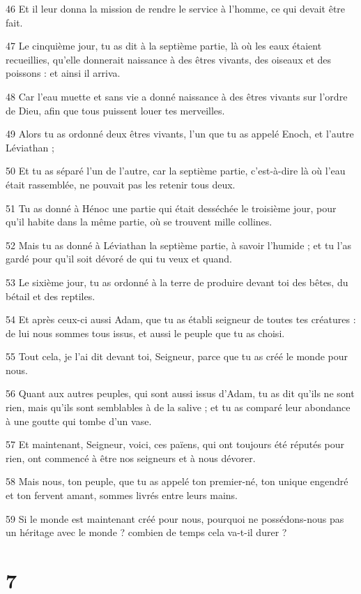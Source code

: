 \par 46 Et il leur donna la mission de rendre le service à l'homme, ce qui devait être fait.
\par 47 Le cinquième jour, tu as dit à la septième partie, là où les eaux étaient recueillies, qu'elle donnerait naissance à des êtres vivants, des oiseaux et des poissons : et ainsi il arriva.
\par 48 Car l'eau muette et sans vie a donné naissance à des êtres vivants sur l'ordre de Dieu, afin que tous puissent louer tes merveilles.
\par 49 Alors tu as ordonné deux êtres vivants, l'un que tu as appelé Enoch, et l'autre Léviathan ;
\par 50 Et tu as séparé l'un de l'autre, car la septième partie, c'est-à-dire là où l'eau était rassemblée, ne pouvait pas les retenir tous deux.
\par 51 Tu as donné à Hénoc une partie qui était desséchée le troisième jour, pour qu'il habite dans la même partie, où se trouvent mille collines.
\par 52 Mais tu as donné à Léviathan la septième partie, à savoir l'humide ; et tu l'as gardé pour qu'il soit dévoré de qui tu veux et quand.
\par 53 Le sixième jour, tu as ordonné à la terre de produire devant toi des bêtes, du bétail et des reptiles.
\par 54 Et après ceux-ci aussi Adam, que tu as établi seigneur de toutes tes créatures : de lui nous sommes tous issus, et aussi le peuple que tu as choisi.
\par 55 Tout cela, je l'ai dit devant toi, Seigneur, parce que tu as créé le monde pour nous.
\par 56 Quant aux autres peuples, qui sont aussi issus d'Adam, tu as dit qu'ils ne sont rien, mais qu'ils sont semblables à de la salive ; et tu as comparé leur abondance à une goutte qui tombe d'un vase.
\par 57 Et maintenant, Seigneur, voici, ces païens, qui ont toujours été réputés pour rien, ont commencé à être nos seigneurs et à nous dévorer.
\par 58 Mais nous, ton peuple, que tu as appelé ton premier-né, ton unique engendré et ton fervent amant, sommes livrés entre leurs mains.
\par 59 Si le monde est maintenant créé pour nous, pourquoi ne possédons-nous pas un héritage avec le monde ? combien de temps cela va-t-il durer ?

\chapter{7}

